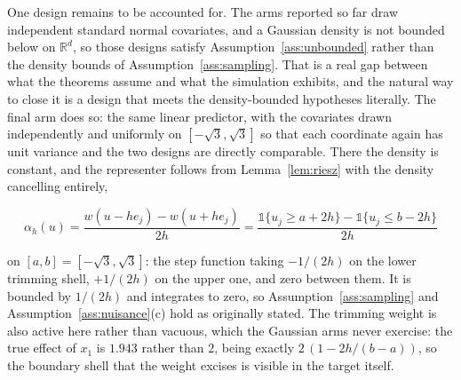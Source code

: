 \documentclass[12pt]{article}
\newcommand{\R}{\mathbb{R}}
\begin{document}
	One design remains to be accounted for. The arms reported so far draw independent standard normal covariates, and a Gaussian density is not bounded below on $\R^d$, so those designs satisfy Assumption~\ref{ass:unbounded} rather than the density bounds of Assumption~\ref{ass:sampling}. That is a real gap between what the theorems assume and what the simulation exhibits, and the natural way to close it is a design that meets the density-bounded hypotheses literally. The final arm does so: the same linear predictor, with the covariates drawn independently and uniformly on $[-\sqrt{3}, \sqrt{3}]$ so that each coordinate again has unit variance and the two designs are directly comparable. There the density is constant, and the representer follows from Lemma~\ref{lem:riesz} with the density cancelling entirely,
	
	\begin{equation}
		\alpha_h(u) = \frac{w(u - h e_j) - w(u + h e_j)}{2h}
		= \frac{\mathbb{1}\{u_j \geq a + 2h\} - \mathbb{1}\{u_j \leq b - 2h\}}{2h}
		\label{eq:unifalpha}
	\end{equation}
	
	on $[a, b] = [-\sqrt{3}, \sqrt{3}]$: the step function taking $-1/(2h)$ on the lower trimming shell, $+1/(2h)$ on the upper one, and zero between them. It is bounded by $1/(2h)$ and integrates to zero, so Assumption~\ref{ass:sampling} and Assumption~\ref{ass:nuisance}(c) hold as originally stated. The trimming weight is also active here rather than vacuous, which the Gaussian arms never exercise: the true effect of $x_1$ is $1.943$ rather than $2$, being exactly $2\,(1 - 2h/(b-a))$, so the boundary shell that the weight excises is visible in the target itself.
	
\end{document}
